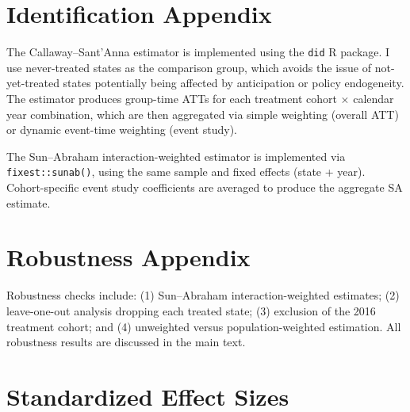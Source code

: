 \documentclass[12pt]{article}
\begin{document}
\section{Identification Appendix}

The Callaway--Sant'Anna estimator is implemented using the \texttt{did} R package. I use never-treated states as the comparison group, which avoids the issue of not-yet-treated states potentially being affected by anticipation or policy endogeneity. The estimator produces group-time ATTs for each treatment cohort $\times$ calendar year combination, which are then aggregated via simple weighting (overall ATT) or dynamic event-time weighting (event study).

The Sun--Abraham interaction-weighted estimator is implemented via \texttt{fixest::sunab()}, using the same sample and fixed effects (state + year). Cohort-specific event study coefficients are averaged to produce the aggregate SA estimate.

\section{Robustness Appendix}

Robustness checks include: (1) Sun--Abraham interaction-weighted estimates; (2) leave-one-out analysis dropping each treated state; (3) exclusion of the 2016 treatment cohort; and (4) unweighted versus population-weighted estimation. All robustness results are discussed in the main text.

\section{Standardized Effect Sizes}
\label{sec:sde}


\end{document}
